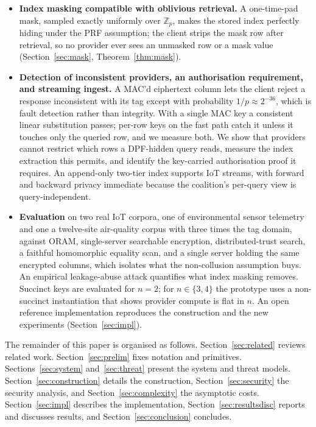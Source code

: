 \documentclass[a4paper,fleqn]{cas-dc}
\begin{document}
\begin{itemize}
\item \textbf{Index masking compatible with oblivious retrieval.} A
one-time-pad mask, sampled exactly uniformly over $\mathbb{Z}_p$, makes the
stored index perfectly hiding under the PRF assumption; the client strips the
mask row after retrieval, so no provider ever sees an unmasked row or a mask
value (Section~\ref{sec:mask}, Theorem~\ref{thm:mask}).

\item \textbf{Detection of inconsistent providers, an authorisation
requirement, and streaming ingest.} A MAC'd ciphertext column lets the client
reject a response inconsistent with its tag except with probability
$1/p\approx2^{-36}$, which is fault detection rather than integrity. With a
single MAC key a consistent linear substitution passes; per-row keys on the
fast path catch it unless it touches only the queried row, and we measure
both. We show that providers cannot
restrict which rows a DPF-hidden query reads, measure the index extraction
this permits, and identify the key-carried authorisation proof it requires. An
append-only two-tier index supports IoT streams, with forward and backward
privacy immediate because the coalition's per-query view is query-independent.

\item \textbf{Evaluation} on two real IoT corpora, one of environmental sensor
telemetry and one a twelve-site air-quality corpus with three times the tag
domain, against ORAM, single-server searchable encryption, distributed-trust
search, a faithful homomorphic equality scan, and a single server holding
the same encrypted columns, which isolates what the non-collusion assumption
buys. An empirical leakage-abuse attack quantifies what index masking removes.
Succinct keys are evaluated for $n=2$; for $n\in\{3,4\}$ the prototype uses a
non-succinct instantiation that shows provider compute is flat in $n$. An open
reference implementation reproduces the construction and the new experiments
(Section~\ref{sec:impl}).
\end{itemize}

The remainder of this paper is organised as follows.
Section~\ref{sec:related} reviews related work. Section~\ref{sec:prelim} fixes
notation and primitives. Sections~\ref{sec:system} and~\ref{sec:threat}
present the system and threat models. Section~\ref{sec:construction} details
the construction, Section~\ref{sec:security} the security analysis, and
Section~\ref{sec:complexity} the asymptotic costs. Section~\ref{sec:impl}
describes the implementation, Section~\ref{sec:resultsdisc} reports and
discusses results, and Section~\ref{sec:conclusion} concludes.
\end{document}

